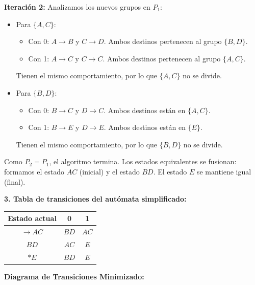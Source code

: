 \documentclass[12pt]{article}
\begin{document}
\textbf{Iteración 2:} Analizamos los nuevos grupos en $P_1$:
\begin{itemize}
    \item Para $\{A, C\}$: 
    \begin{itemize}
        \item Con 0: $A \rightarrow B$ y $C \rightarrow D$. Ambos destinos pertenecen al grupo $\{B, D\}$.
        \item Con 1: $A \rightarrow C$ y $C \rightarrow C$. Ambos destinos pertenecen al grupo $\{A, C\}$.
    \end{itemize}
    Tienen el mismo comportamiento, por lo que $\{A, C\}$ no se divide.
    
    \item Para $\{B, D\}$:
    \begin{itemize}
        \item Con 0: $B \rightarrow C$ y $D \rightarrow C$. Ambos destinos están en $\{A, C\}$.
        \item Con 1: $B \rightarrow E$ y $D \rightarrow E$. Ambos destinos están en $\{E\}$.
    \end{itemize}
    Tienen el mismo comportamiento, por lo que $\{B, D\}$ no se divide.
\end{itemize}
Como $P_2 = P_1$, el algoritmo termina. Los estados equivalentes se fusionan: formamos el estado $AC$ (inicial) y el estado $BD$. El estado $E$ se mantiene igual (final).

\vspace{0.5cm}

\textbf{3. Tabla de transiciones del autómata simplificado:}

\begin{center}
\begin{tabular}{|c|c|c|}
\hline
\textbf{Estado actual} & \textbf{0} & \textbf{1} \\
\hline
$\rightarrow AC$ & $BD$ & $AC$ \\
\hline
$BD$ & $AC$ & $E$ \\
\hline
$*E$ & $BD$ & $E$ \\
\hline
\end{tabular}
\end{center}

\vspace{0.5cm}

\textbf{Diagrama de Transiciones Minimizado:}
\end{document}
